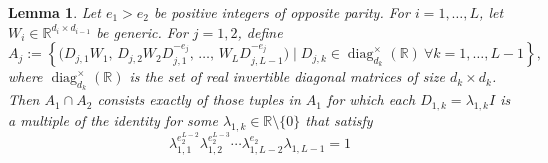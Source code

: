 \documentclass{article} %
\theoremstyle{plain}%
\newtheorem{lemm}[thm]{Lemma}
\theoremstyle{definition}
\theoremstyle{remark}
\begin{document}
\begin{lemm}
\label{lem:diag_fiber_scalar}
Let $e_1>e_2$ be positive integers of opposite parity.  
For $i=1,\ldots,L$, let  $W_i\in\mathbb R^{d_i\times d_{i-1}}$ be generic. For $j=1,2$, define  
\begin{equation}
A_j:=\left\{
\bigl(D_{j,1}W_1,\,
D_{j,2}W_2D_{j,1}^{-e_j},\,
\dots,\,
W_LD_{j,L-1}^{-e_j}\bigr)
\mid 
D_{j,k}\in\operatorname{diag}_{d_k}^{\times}(\mathbb R)\  \forall k=1,\ldots, L-1
\right\},
\end{equation}
where $\operatorname{diag}_{d_k}^{\times}(\mathbb R)$ is the set of real invertible diagonal matrices of size $d_k\times d_k$.
Then $A_1\cap A_2$ consists exactly of those tuples in $A_1$ for which each $D_{1,k}=\lambda_{1,k}I$ is a multiple of the identity for some $\lambda_{1,k} \in \mathbb{R} \setminus \{ 0 \}$ that satisfy 
\begin{equation}
\lambda_{1,1}^{e_2^{L-2}}
\lambda_{1,2}^{ e_2^{L-3} }
\cdots
\lambda_{1,L-2}^{e_2} \lambda_{1,L-1}=1
\end{equation}
\end{lemm}
\end{document}
